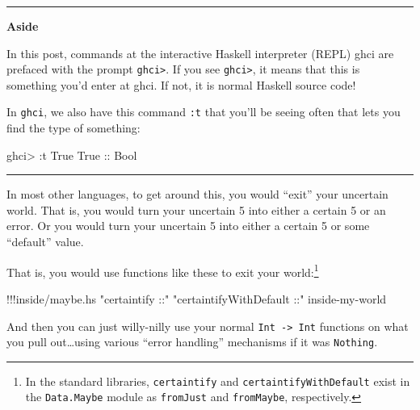 \documentclass[]{article}
\newenvironment{Shaded}{}{}
\newcommand{\DataTypeTok}[1]{\textcolor[rgb]{0.56,0.13,0.00}{{#1}}}
\newcommand{\StringTok}[1]{\textcolor[rgb]{0.25,0.44,0.63}{{#1}}}
\newcommand{\OtherTok}[1]{\textcolor[rgb]{0.00,0.44,0.13}{{#1}}}
\newcommand{\FunctionTok}[1]{\textcolor[rgb]{0.02,0.16,0.49}{{#1}}}
\newcommand{\NormalTok}[1]{{#1}}
\begin{document}
\begin{center}\rule{0.5\linewidth}{\linethickness}\end{center}

\textbf{Aside}

In this post, commands at the interactive Haskell interpreter (REPL)
ghci are prefaced with the prompt \texttt{ghci\textgreater{}}. If you
see \texttt{ghci\textgreater{}}, it means that this is something you'd
enter at ghci. If not, it is normal Haskell source code!

In \texttt{ghci}, we also have this command \texttt{:t} that you'll be
seeing often that lets you find the type of something:

\begin{Shaded}
\begin{Highlighting}[]
\NormalTok{ghci}\FunctionTok{>} \FunctionTok{:}\NormalTok{t }\DataTypeTok{True}
\DataTypeTok{True}\OtherTok{ ::} \DataTypeTok{Bool}
\end{Highlighting}
\end{Shaded}

\begin{center}\rule{0.5\linewidth}{\linethickness}\end{center}

In most other languages, to get around this, you would ``exit'' your
uncertain world. That is, you would turn your uncertain 5 into either a
certain 5 or an error. Or you would turn your uncertain 5 into either a
certain 5 or some ``default'' value.

That is, you would use functions like these to exit your
world:\footnote{In the standard libraries, \texttt{certaintify} and
  \texttt{certaintifyWithDefault} exist in the \texttt{Data.Maybe}
  module as \texttt{fromJust} and \texttt{fromMaybe}, respectively.}

\begin{Shaded}
\begin{Highlighting}[]
\FunctionTok{!!!}\NormalTok{inside}\FunctionTok{/}\NormalTok{maybe}\FunctionTok{.}\NormalTok{hs }\StringTok{"certaintify ::"} \StringTok{"certaintifyWithDefault ::"} \NormalTok{inside}\FunctionTok{-}\NormalTok{my}\FunctionTok{-}\NormalTok{world}
\end{Highlighting}
\end{Shaded}

And then you can just willy-nilly use your normal
\texttt{Int\ -\textgreater{}\ Int} functions on what you pull
out\ldots{}using various ``error handling'' mechanisms if it was
\texttt{Nothing}.
\end{document}
